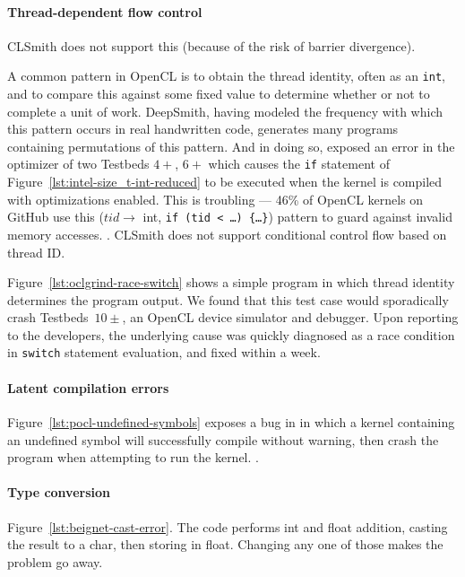 \paragraph{Thread-dependent flow control} CLSmith does not support this (because of the risk of barrier divergence).

A common pattern in OpenCL is to obtain the thread identity, often as an \texttt{int}, and to compare this against some fixed value to determine whether or not to complete a unit of work. DeepSmith, having modeled the frequency with which this pattern occurs in real handwritten code, generates many programs containing permutations of this pattern. And in doing so, exposed an error in the optimizer of two Testbeds $4+$, $6+$ which causes the \texttt{if} statement of Figure~\ref{lst:intel-size_t-int-reduced} to be executed when the kernel is compiled with optimizations enabled.
%
 This is troubling --- 46\% of OpenCL kernels on GitHub use this ($tid \rightarrow$ int, \texttt{if (tid < \ldots) \{\ldots\}}) pattern to guard against invalid memory accesses. . CLSmith does not support conditional control flow based on thread ID. %

Figure~\ref{lst:oclgrind-race-switch} shows a simple program in which thread identity determines the program output. We found that this test case would sporadically crash Testbeds~$10\pm$, an OpenCL device simulator and debugger. Upon reporting to the developers, the underlying cause was quickly diagnosed as a race condition in \texttt{switch} statement evaluation, and fixed within a week.

\paragraph{Latent compilation errors} Figure~\ref{lst:pocl-undefined-symbols} exposes a bug in in which a kernel containing an undefined symbol will successfully compile without warning, then crash the program when attempting to run the kernel. .

\paragraph{Type conversion} Figure~\ref{lst:beignet-cast-error}. The code performs int and float addition, casting the result to a char, then storing in float. Changing any one of those makes the problem go away.


